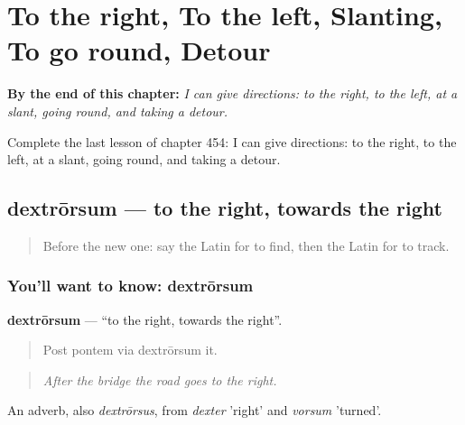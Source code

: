 
\chapter{To the right, To the left, Slanting, To go round, Detour}
\label{ch:la-to-the-right-to-the-left-slanting-to-go-round-detour}

\begin{chapteropening}
\textbf{By the end of this chapter:} \emph{I can give directions: to the right, to the left, at a slant, going round, and taking a detour.}

Complete the last lesson of chapter 454: I can give directions: to the right, to the left, at a slant, going round, and taking a detour.
\end{chapteropening}

\section[dextrōrsum]{dextrōrsum — to the right, towards the right}

\label{lesson:LA-C454-dextrorsum}



\begin{quote}
Before the new one: say the Latin for to find, then the Latin for to track.
\end{quote}

\subsection*{You'll want to know: dextrōrsum}
\textbf{dextrōrsum} — \textquotedblleft{}to the right, towards the right\textquotedblright{}.

\begin{quote}
Post pontem via dextrōrsum it.
\end{quote}

\begin{quote}
\emph{After the bridge the road goes to the right.}
\end{quote}

An adverb, also \emph{dextrōrsus}, from \emph{dexter} 'right' and \emph{vorsum} 'turned'.

